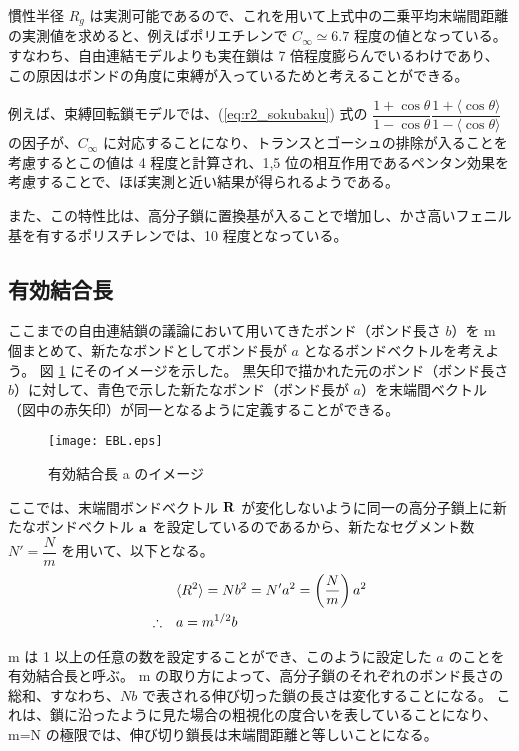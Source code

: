 \documentclass[a4paper,11pt]{ltjsarticle}
\begin{document}
慣性半径 $R_g$ は実測可能であるので、これを用いて上式中の二乗平均末端間距離の実測値を求めると、例えばポリエチレンで $C_{\infty} \simeq 6.7$ 程度の値となっている。
すなわち、自由連結モデルよりも実在鎖は 7 倍程度膨らんでいるわけであり、この原因はボンドの角度に束縛が入っているためと考えることができる。

例えば、束縛回転鎖モデルでは、(\ref{eq:r2_sokubaku}) 式の $\dfrac{1+\cos \theta}{1-\cos \theta} \dfrac{1+ \langle \cos \theta \rangle}{1- \langle \cos \theta \rangle}$ の因子が、$C_{\infty}$ に対応することになり、トランスとゴーシュの排除が入ることを考慮するとこの値は 4 程度と計算され、1,5 位の相互作用であるペンタン効果を考慮することで、ほぼ実測と近い結果が得られるようである。

また、この特性比は、高分子鎖に置換基が入ることで増加し、かさ高いフェニル基を有するポリスチレンでは、10 程度となっている。



\subsection{有効結合長}

ここまでの自由連結鎖の議論において用いてきたボンド（ボンド長さ $b$）を m 個まとめて、新たなボンドとしてボンド長が $a$ となるボンドベクトルを考えよう。
図 \ref{fig: EBL} にそのイメージを示した。
黒矢印で描かれた元のボンド（ボンド長さ $b$）に対して、青色で示した新たなボンド（ボンド長が $a$）を末端間ベクトル（図中の赤矢印）が同一となるように定義することができる。
\begin{figure}[htb]
 \centering
	\texttt{[image: EBL.eps]}
	\caption{有効結合長 a のイメージ}
	\label{fig: EBL}
\end{figure}

ここでは、末端間ボンドベクトル ${\bf R}$ が変化しないように同一の高分子鎖上に新たなボンドベクトル ${\bf a}$ を設定しているのであるから、新たなセグメント数 $N'=\dfrac{N}{m}$ を用いて、以下となる。
\begin{align}
&\langle R^2 \rangle = N b^2 = N' a^2 = \left(\dfrac{N}{m}\right) a^2 \notag \\
\therefore \quad &a = m^{1/2} b
\label{eq:EBL}
\end{align}

m は 1 以上の任意の数を設定することができ、このように設定した $a$ のことを有効結合長と呼ぶ。 
m の取り方によって、高分子鎖のそれぞれのボンド長さの総和、すなわち、$Nb$ で表される伸び切った鎖の長さは変化することになる。
これは、鎖に沿ったように見た場合の粗視化の度合いを表していることになり、m=N の極限では、伸び切り鎖長は末端間距離と等しいことになる。
\end{document}
